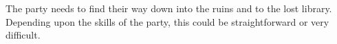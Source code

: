 The party needs to find their way down into the ruins and to the lost library.
Depending upon the skills of the party, this could be straightforward or very difficult.
